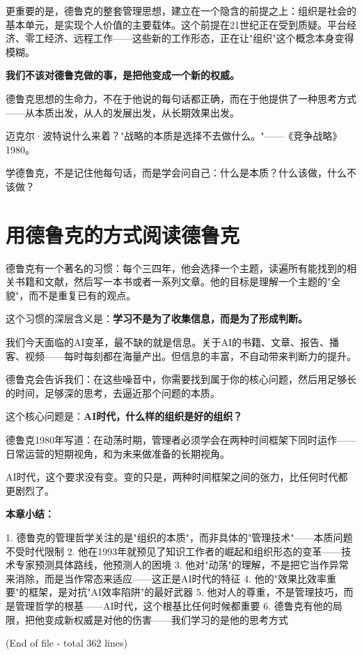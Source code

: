 更重要的是，德鲁克的整套管理思想，建立在一个隐含的前提之上：组织是社会的基本单元，是实现个人价值的主要载体。这个前提在21世纪正在受到质疑。平台经济、零工经济、远程工作——这些新的工作形态，正在让"组织"这个概念本身变得模糊。

\textbf{我们不该对德鲁克做的事，是把他变成一个新的权威。}

德鲁克思想的生命力，不在于他说的每句话都正确，而在于他提供了一种思考方式——从本质出发，从人的发展出发，从长期效果出发。

迈克尔·波特说什么来着？"战略的本质是选择不去做什么。"——《竞争战略》1980。

学德鲁克，不是记住他每句话，而是学会问自己：什么是本质？什么该做，什么不该做？


\section{用德鲁克的方式阅读德鲁克}


德鲁克有一个著名的习惯：每个三四年，他会选择一个主题，读遍所有能找到的相关书籍和文献，然后写一本书或者一系列文章。他的目标是理解一个主题的"全貌"，而不是重复已有的观点。

这个习惯的深层含义是：\textbf{学习不是为了收集信息，而是为了形成判断。}

我们今天面临的AI变革，最不缺的就是信息。关于AI的书籍、文章、报告、播客、视频——每时每刻都在海量产出。但信息的丰富，不自动带来判断力的提升。

德鲁克会告诉我们：在这些噪音中，你需要找到属于你的核心问题，然后用足够长的时间，足够深的思考，去逼近那个问题的本质。

这个核心问题是：\textbf{AI时代，什么样的组织是好的组织？}

德鲁克1980年写道：在动荡时期，管理者必须学会在两种时间框架下同时运作——日常运营的短期视角，和为未来做准备的长期视角。

AI时代，这个要求没有变。变的只是，两种时间框架之间的张力，比任何时代都更剧烈了。


\textbf{本章小结：}

1. 德鲁克的管理哲学关注的是"组织的本质"，而非具体的"管理技术"——本质问题不受时代限制
2. 他在1993年就预见了知识工作者的崛起和组织形态的变革——技术专家预测具体路线，他预测人的困境
3. 他对"动荡"的理解，不是把它当作异常来消除，而是当作常态来适应——这正是AI时代的特征
4. 他的"效果比效率重要"的框架，是对抗"AI效率陷阱"的最好武器
5. 他对人的尊重，不是管理技巧，而是管理哲学的根基——AI时代，这个根基比任何时候都重要
6. 德鲁克有他的局限，把他变成新权威是对他的伤害——我们学习的是他的思考方式

(End of file - total 362 lines)